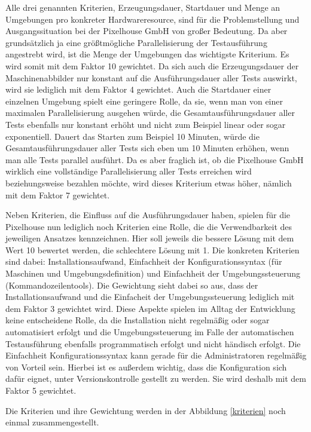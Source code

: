 Alle drei genannten Kriterien, Erzeugungsdauer, Startdauer und Menge an Umgebungen pro konkreter Hardwareresource, sind für die Problemstellung und Ausgangssituation bei der Pixelhouse GmbH von großer Bedeutung. Da aber grundsätzlich ja eine größtmögliche Parallelisierung der Testausführung angestrebt wird, ist die Menge der Umgebungen das wichtigste Kriterium. Es wird somit mit dem Faktor 10 gewichtet. Da sich auch die Erzeugungsdauer der Maschinenabbilder nur konstant auf die Ausführungsdauer aller Tests auswirkt, wird sie lediglich mit dem Faktor 4 gewichtet. Auch die Startdauer einer einzelnen Umgebung spielt eine geringere Rolle, da sie, wenn man von einer maximalen Parallelisierung ausgehen würde, die Gesamtausführungsdauer aller Tests ebenfalls nur konstant erhöht und nicht zum Beispiel linear oder sogar exponentiell. Dauert das Starten zum Beispiel 10 Minuten, würde die Gesamtausführungsdauer aller Tests sich eben um 10 Minuten erhöhen, wenn man alle Tests parallel ausführt. Da es aber fraglich ist, ob die Pixelhouse GmbH wirklich eine vollständige Parallelisierung aller Tests erreichen wird beziehungsweise bezahlen möchte, wird dieses Kriterium etwas höher, nämlich mit dem Faktor 7 gewichtet.

Neben Kriterien, die Einfluss auf die Ausführungsdauer haben, spielen für die Pixelhouse nun lediglich noch Kriterien eine Rolle, die die Verwendbarkeit des jeweiligen Ansatzes kennzeichnen. Hier soll jeweils die bessere Lösung mit dem Wert 10 bewertet werden, die schlechtere Lösung mit 1. Die konkreten Kriterien sind dabei: Installationsaufwand, Einfachheit der Konfigurationssyntax (für Maschinen und Umgebungsdefinition) und Einfachheit der Umgebungssteuerung (Kommandozeilentools). Die Gewichtung sieht dabei so aus, dass der Installationsaufwand und die Einfacheit der Umgebungssteuerung lediglich mit dem Faktor 3 gewichtet wird. Diese Aspekte spielen im Alltag der Entwicklung keine entscheidene Rolle, da die Installation nicht regelmäßig oder sogar automatisiert erfolgt und die Umgebungssteuerung im Falle der automatischen Testausführung ebenfalls programmatisch erfolgt und nicht händisch erfolgt. Die Einfachheit Konfigurationssyntax kann gerade für die Administratoren regelmäßig von Vorteil sein. Hierbei ist es außerdem wichtig, dass die Konfiguration sich dafür eignet, unter Versionskontrolle gestellt zu werden. Sie wird deshalb mit dem Faktor 5 gewichtet. 

Die Kriterien und ihre Gewichtung werden in der Abbildung \ref{kriterien} noch einmal zusammengestellt.

